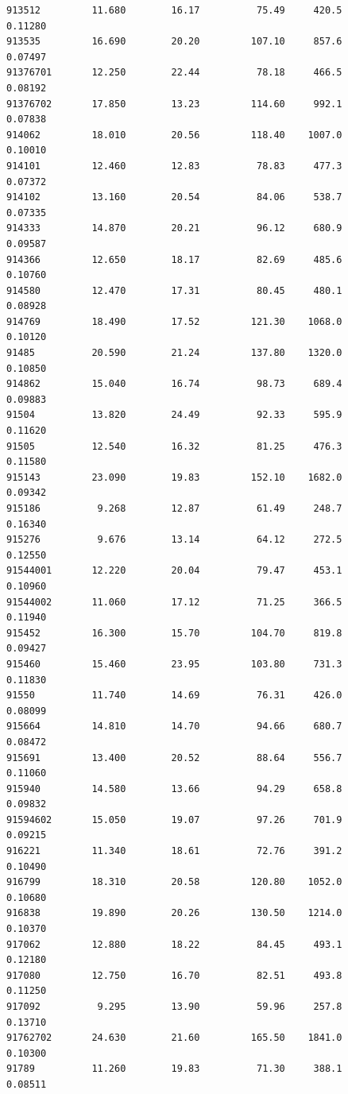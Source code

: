 \documentclass[
  letterpaper,
  DIV=11,
  numbers=noendperiod]{scrartcl}
\begin{document}
\begin{verbatim}
913512         11.680        16.17          75.49     420.5         0.11280
913535         16.690        20.20         107.10     857.6         0.07497
91376701       12.250        22.44          78.18     466.5         0.08192
91376702       17.850        13.23         114.60     992.1         0.07838
914062         18.010        20.56         118.40    1007.0         0.10010
914101         12.460        12.83          78.83     477.3         0.07372
914102         13.160        20.54          84.06     538.7         0.07335
914333         14.870        20.21          96.12     680.9         0.09587
914366         12.650        18.17          82.69     485.6         0.10760
914580         12.470        17.31          80.45     480.1         0.08928
914769         18.490        17.52         121.30    1068.0         0.10120
91485          20.590        21.24         137.80    1320.0         0.10850
914862         15.040        16.74          98.73     689.4         0.09883
91504          13.820        24.49          92.33     595.9         0.11620
91505          12.540        16.32          81.25     476.3         0.11580
915143         23.090        19.83         152.10    1682.0         0.09342
915186          9.268        12.87          61.49     248.7         0.16340
915276          9.676        13.14          64.12     272.5         0.12550
91544001       12.220        20.04          79.47     453.1         0.10960
91544002       11.060        17.12          71.25     366.5         0.11940
915452         16.300        15.70         104.70     819.8         0.09427
915460         15.460        23.95         103.80     731.3         0.11830
91550          11.740        14.69          76.31     426.0         0.08099
915664         14.810        14.70          94.66     680.7         0.08472
915691         13.400        20.52          88.64     556.7         0.11060
915940         14.580        13.66          94.29     658.8         0.09832
91594602       15.050        19.07          97.26     701.9         0.09215
916221         11.340        18.61          72.76     391.2         0.10490
916799         18.310        20.58         120.80    1052.0         0.10680
916838         19.890        20.26         130.50    1214.0         0.10370
917062         12.880        18.22          84.45     493.1         0.12180
917080         12.750        16.70          82.51     493.8         0.11250
917092          9.295        13.90          59.96     257.8         0.13710
91762702       24.630        21.60         165.50    1841.0         0.10300
91789          11.260        19.83          71.30     388.1         0.08511

\end{verbatim}
\end{document}
